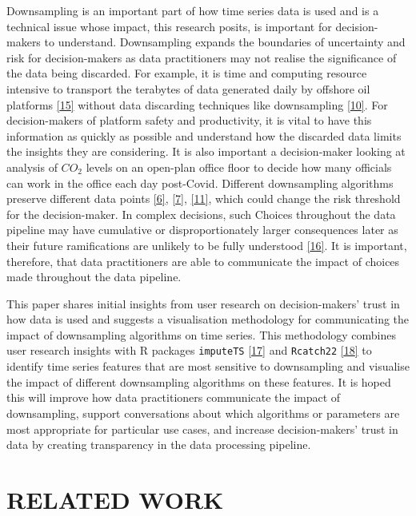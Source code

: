 \documentclass{article}
\begin{document}
Downsampling is an important part of how time series data is used and is
a technical issue whose impact, this research posits, is important for
decision-makers to understand. Downsampling expands the boundaries of
uncertainty and risk for decision-makers as data practitioners may not
realise the significance of the data being discarded. For example, it is
time and computing resource intensive to transport the terabytes of data
generated daily by offshore oil platforms
\protect\hyperlink{ref-CISCO}{{[}15{]}} without data discarding
techniques like downsampling \protect\hyperlink{ref-TVStore}{{[}10{]}}.
For decision-makers of platform safety and productivity, it is vital to
have this information as quickly as possible and understand how the
discarded data limits the insights they are considering. It is also
important a decision-maker looking at analysis of \(CO_2\) levels on an
open-plan office floor to decide how many officials can work in the
office each day post-Covid. Different downsampling algorithms preserve
different data points \protect\hyperlink{ref-datapoint}{{[}6{]}},
\protect\hyperlink{ref-MinMaxLTTB}{{[}7{]}},
\protect\hyperlink{ref-Sveinn}{{[}11{]}}, which could change the risk
threshold for the decision-maker. In complex decisions, such Choices
throughout the data pipeline may have cumulative or disproportionately
larger consequences later as their future ramifications are unlikely to
be fully understood \protect\hyperlink{ref-challenger}{{[}16{]}}. It is
important, therefore, that data practitioners are able to communicate
the impact of choices made throughout the data pipeline.

This paper shares initial insights from user research on
decision-makers' trust in how data is used and suggests a visualisation
methodology for communicating the impact of downsampling algorithms on
time series. This methodology combines user research insights with R
packages \texttt{imputeTS} \protect\hyperlink{ref-imputeTS_R}{{[}17{]}}
and \texttt{Rcatch22} \protect\hyperlink{ref-catch22_R}{{[}18{]}} to
identify time series features that are most sensitive to downsampling
and visualise the impact of different downsampling algorithms on these
features. It is hoped this will improve how data practitioners
communicate the impact of downsampling, support conversations about
which algorithms or parameters are most appropriate for particular use
cases, and increase decision-makers' trust in data by creating
transparency in the data processing pipeline.

\hypertarget{related-work}{%
\section{RELATED WORK}\label{related-work}}
\end{document}

